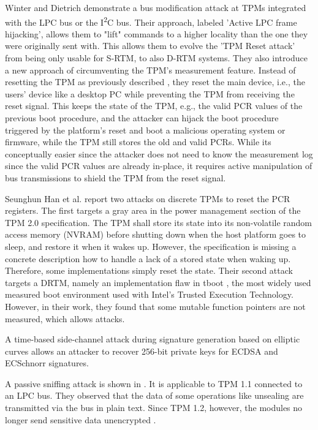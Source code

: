 Winter and Dietrich \cite{Winter2013} demonstrate a bus modification attack at TPMs integrated with the LPC bus or the I\textsuperscript{2}C bus.
Their approach, labeled 'Active LPC frame hijacking', allows them to "lift" commands to a higher locality than the one they were originally sent with. This allows them to evolve the 'TPM Reset attack' from being only usable for S-RTM, to also D-RTM systems.
They also introduce a new approach of circumventing the TPM's measurement feature. Instead of resetting the TPM as previously described \cite{kauerBernhard,sparks2007}, they reset the main device, i.e., the users' device like a desktop PC while preventing the TPM from receiving the reset signal. This keeps the state of the TPM, e.g., the valid \ac{PCR} values of the previous boot procedure, and the attacker can hijack the boot procedure triggered by the platform's reset and boot a malicious operating system or firmware, while the TPM still stores the old and valid PCRs. While its conceptually easier since the attacker does not need to know the measurement log since the valid \ac{PCR} values are already in-place, it requires active manipulation of bus transmissions to shield the TPM from the reset signal.

Seunghun Han et al. \cite{aBadDream} report two attacks on discrete TPMs to reset the PCR registers. The first targets a gray area in the power management section of the TPM 2.0 specification. The TPM shall store its state into its non-volatile random access memory (NVRAM) before shutting down when the host platform goes to sleep, and restore it when it wakes up. However, the specification is missing a concrete description how to handle a lack of a stored state when waking up. Therefore, some implementations simply reset the state. Their second attack targets a DRTM, namely an implementation flaw in tboot \cite{tboot}, the most widely used measured boot environment used with Intel's Trusted Execution Technology. However, in their work, they found that some mutable function pointers are not measured, which allows attacks.

A time-based side-channel attack \cite{Moghimi2019} during signature generation based on elliptic curves allows an attacker to recover 256-bit private keys for ECDSA and ECSchnorr signatures.

A passive sniffing attack is shown in \cite{Kursawe2005AnalyzingTP}. It is applicable to TPM 1.1 connected to an LPC bus. They observed that the data of some operations like unsealing are transmitted via the bus in plain text. Since TPM 1.2, however, the modules no longer send sensitive data unencrypted \cite{Winter2013}.

